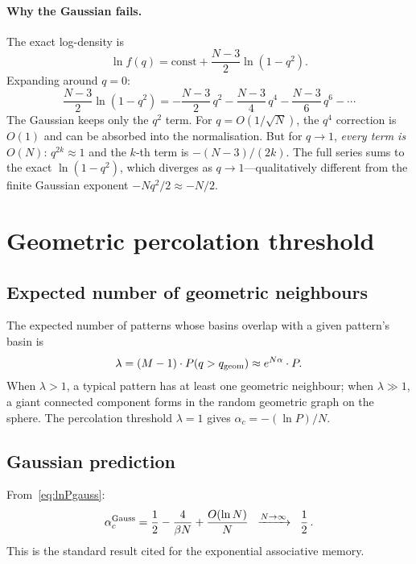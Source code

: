 \documentclass[11pt]{article}
\begin{document}
\paragraph{Why the Gaussian fails.}
The exact log-density is
\begin{equation}
  \ln f(q) = \text{const} + \frac{N{-}3}{2}\ln(1-q^2).
\end{equation}
Expanding around $q = 0$:
\begin{equation}\label{eq:series}
  \frac{N{-}3}{2}\ln(1-q^2)
  = -\frac{N{-}3}{2}\,q^2
  - \frac{N{-}3}{4}\,q^4
  - \frac{N{-}3}{6}\,q^6
  - \cdots
\end{equation}
The Gaussian keeps only the $q^2$ term.
For $q = O(1/\sqrt{N})$, the $q^4$ correction is $O(1)$
and can be absorbed into the normalisation.
But for $q \to 1$, \emph{every term is $O(N)$}:
$q^{2k} \approx 1$ and the $k$-th term is $-(N{-}3)/(2k)$.
The full series sums to the exact $\ln(1-q^2)$, which
diverges as $q \to 1$---qualitatively different from
the finite Gaussian exponent $-Nq^2/2 \approx -N/2$.


\section{Geometric percolation threshold}
\label{sec:threshold}

\subsection{Expected number of geometric neighbours}

The expected number of patterns whose basins overlap with a given
pattern's basin is
\begin{equation}\label{eq:lambda}
  \lambda = (M - 1) \cdot P(q > q_{\rm geom})
  \approx e^{N\alpha} \cdot P.
\end{equation}
When $\lambda > 1$, a typical pattern has at least one
geometric neighbour; when $\lambda \gg 1$, a giant connected
component forms in the random geometric graph on the sphere.
The percolation threshold $\lambda = 1$ gives
$\alpha_c = -(\ln P)/N$.

\subsection{Gaussian prediction}

From~\eqref{eq:lnPgauss}:
\begin{equation}\label{eq:ac_gauss}
  \alpha_c^{\rm Gauss}
  = \frac{1}{2} - \frac{4}{\beta N}
  + \frac{O(\ln N)}{N}
  \;\;\xrightarrow{N \to \infty}\;\;
  \frac{1}{2}\,.
\end{equation}
This is the standard result cited for the exponential
associative memory.
\end{document}
